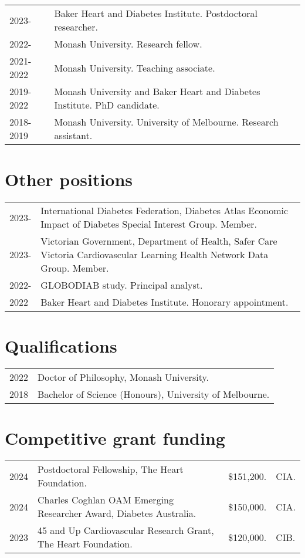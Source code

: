 \documentclass[11pt]{article}
\begin{document}
\begin{tabular}{p{2cm}p{14cm}}
2023- & Baker Heart and Diabetes Institute. Postdoctoral researcher. \\
2022- & Monash University. Research fellow. \\
2021-2022 & Monash University. Teaching associate. \\
2019-2022 & Monash University and Baker Heart and Diabetes Institute. PhD candidate. \\
2018-2019 & Monash University. University of Melbourne. Research assistant. \\
\end{tabular}

\section*{Other positions}
\begin{tabular}{p{2cm}p{14cm}}
2023- & International Diabetes Federation, Diabetes Atlas Economic Impact of Diabetes Special Interest Group. Member. \\
2023- & Victorian Government, Department of Health, 
Safer Care Victoria Cardiovascular Learning Health Network Data Group. Member. \\
2022- & GLOBODIAB study. Principal analyst.  \\
2022 & Baker Heart and Diabetes Institute. Honorary appointment.  \\
\end{tabular}

\section*{Qualifications}
\begin{tabular}{p{2cm}p{14cm}}
2022 & Doctor of Philosophy, Monash University. \\
2018 & Bachelor of Science (Honours), University of Melbourne. \\
\end{tabular}


\section*{Competitive grant funding}
\begin{tabular}{p{2cm}p{11.5cm}p{1.5cm}p{1cm}}
2024 & Postdoctoral Fellowship, The Heart Foundation. & \$151,200. & CIA. \\
2024 & Charles Coghlan OAM Emerging Researcher Award, Diabetes Australia. & \$150,000. & CIA. \\
2023 & 45 and Up Cardiovascular Research Grant, The Heart Foundation. & \$120,000. & CIB. \\
\end{tabular}
\end{document}
